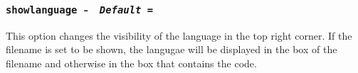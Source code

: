 \documentclass{article}
\begin{document}
\subsubsection*{\texttt{showlanguage}~-~%
    \hfill \textnormal{\small\textit{\texttt{Default = }}}}

This option changes the visibility of the language in the top right corner. If the filename is set to be shown, the langugae will be displayed in the box of the filename and otherwise in the box that contains the code.\\
\end{document}
